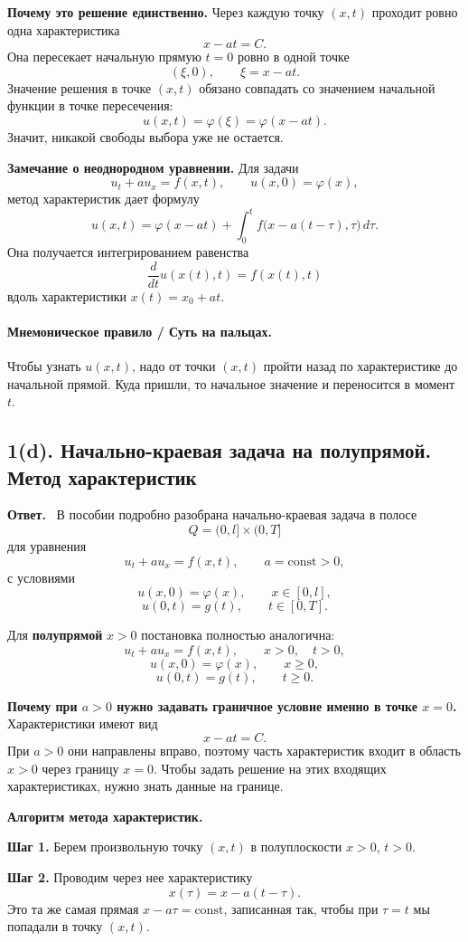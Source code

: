 \documentclass[a4paper,12pt]{article}
\newcommand{\Answer}{\textbf{Ответ.}\ }
\begin{document}
\textbf{Почему это решение единственно.} Через каждую точку $(x,t)$ проходит ровно одна характеристика
\[
x-at=C.
\]
Она пересекает начальную прямую $t=0$ ровно в одной точке
\[
(\xi,0),
\qquad \xi=x-at.
\]
Значение решения в точке $(x,t)$ обязано совпадать со значением начальной функции в точке пересечения:
\[
u(x,t)=\varphi(\xi)=\varphi(x-at).
\]
Значит, никакой свободы выбора уже не остается.

\textbf{Замечание о неоднородном уравнении.} Для задачи
\[
u_t+a u_x=f(x,t),
\qquad
u(x,0)=\varphi(x),
\]
метод характеристик дает формулу
\[
u(x,t)=\varphi(x-at)+\int_0^t f\bigl(x-a(t-\tau),\tau\bigr)\,d\tau.
\]
Она получается интегрированием равенства
\[
\frac{d}{dt}u(x(t),t)=f(x(t),t)
\]
вдоль характеристики $x(t)=x_0+at$.

\paragraph{Мнемоническое правило / Суть на пальцах.}
Чтобы узнать $u(x,t)$, надо от точки $(x,t)$ пройти назад по характеристике до начальной прямой. Куда пришли, то начальное значение и переносится в момент $t$.

\subsection*{1(d). Начально-краевая задача на полупрямой. Метод характеристик}

\Answer
В пособии подробно разобрана начально-краевая задача в полосе
\[
Q=(0,l]\times(0,T]
\]
для уравнения
\[
u_t+a u_x=f(x,t),
\qquad a=\mathrm{const}>0,
\]
с условиями
\[
u(x,0)=\varphi(x),
\qquad x\in[0,l],
\]
\[
u(0,t)=g(t),
\qquad t\in[0,T].
\]

Для \textbf{полупрямой} $x>0$ постановка полностью аналогична:
\[
u_t+a u_x=f(x,t),
\qquad x>0,\quad t>0,
\]
\[
u(x,0)=\varphi(x),
\qquad x\ge 0,
\]
\[
u(0,t)=g(t),
\qquad t\ge 0.
\]

\textbf{Почему при $a>0$ нужно задавать граничное условие именно в точке $x=0$.}
Характеристики имеют вид
\[
x-at=C.
\]
При $a>0$ они направлены вправо, поэтому часть характеристик входит в область $x>0$ через границу $x=0$. Чтобы задать решение на этих входящих характеристиках, нужно знать данные на границе.

\textbf{Алгоритм метода характеристик.}

\textbf{Шаг 1.} Берем произвольную точку $(x,t)$ в полуплоскости $x>0$, $t>0$.

\textbf{Шаг 2.} Проводим через нее характеристику
\[
x(\tau)=x-a(t-\tau).
\]
Это та же самая прямая $x-a\tau=\mathrm{const}$, записанная так, чтобы при $\tau=t$ мы попадали в точку $(x,t)$.
\end{document}
